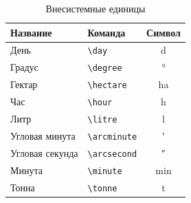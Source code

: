 \begin{table}
    \centering
    \begin{threeparttable}%
        \caption{Внесистемные единицы}\label{tab:unit:accepted}

        \begin{tabular}{llc}
            \toprule
            Название        & Команда                 & Символ          \\
            \midrule
            День            & \verb|\day| & \si{\day}       \\
            Градус          & \verb|\degree| & \si{\degree}    \\
            Гектар          & \verb|\hectare| & \si{\hectare}   \\
            Час             & \verb|\hour| & \si{\hour}      \\
            Литр            & \verb|\litre| & \si{\litre}     \\
            Угловая минута  & \verb|\arcminute| & \si{\arcminute} \\
            Угловая секунда & \verb|\arcsecond| & \si{\arcsecond} \\ %
            Минута          & \verb|\minute| & \si{\minute}    \\
            Тонна           & \verb|\tonne| & \si{\tonne}     \\
            \bottomrule
        \end{tabular}
    \end{threeparttable}
\end{table}

